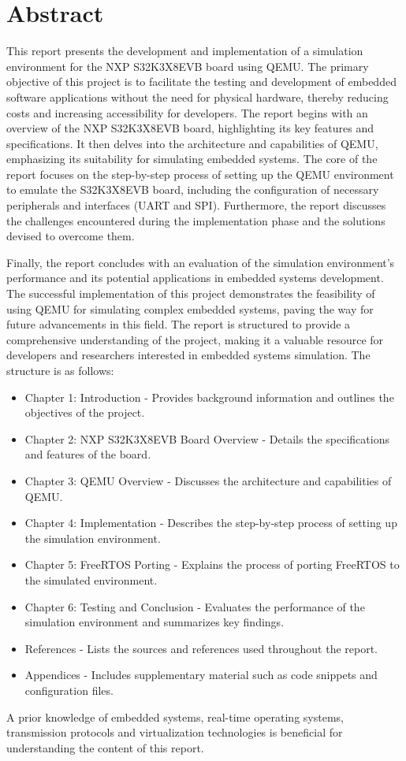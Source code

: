\chapter{Abstract}
\label{Abstract}

This report presents the development and implementation of a simulation environment for the NXP S32K3X8EVB board using QEMU. The primary objective of this project is to facilitate the testing and development of embedded software applications without the need for physical hardware, thereby reducing costs and increasing accessibility for developers.
The report begins with an overview of the NXP S32K3X8EVB board, highlighting its key features and specifications. It then delves into the architecture and capabilities of QEMU, emphasizing its suitability for simulating embedded systems. The core of the report focuses on the step-by-step process of setting up the QEMU environment to emulate the S32K3X8EVB board, including the configuration of necessary peripherals and interfaces (UART and SPI).
Furthermore, the report discusses the challenges encountered during the implementation phase and the solutions devised to overcome them.

Finally, the report concludes with an evaluation of the simulation environment's performance and its potential applications in embedded systems development. The successful implementation of this project demonstrates the feasibility of using QEMU for simulating complex embedded systems, paving the way for future advancements in this field.
The report is structured to provide a comprehensive understanding of the project, making it a valuable resource for developers and researchers interested in embedded systems simulation. The structure is as follows:
\begin{itemize}
    \item Chapter 1: Introduction - Provides background information and outlines the objectives of the project.
    \item Chapter 2: NXP S32K3X8EVB Board Overview - Details the specifications and features of the board.
    \item Chapter 3: QEMU Overview - Discusses the architecture and capabilities of QEMU.
    \item Chapter 4: Implementation - Describes the step-by-step process of setting up the simulation environment.
    \item Chapter 5: FreeRTOS Porting - Explains the process of porting FreeRTOS to the simulated environment.
    \item Chapter 6: Testing and Conclusion - Evaluates the performance of the simulation environment and summarizes key findings.
    \item References - Lists the sources and references used throughout the report.
    \item Appendices - Includes supplementary material such as code snippets and configuration files.
\end{itemize} 

A prior knowledge of embedded systems, real-time operating systems, transmission protocols and virtualization technologies is beneficial for understanding the content of this report.
